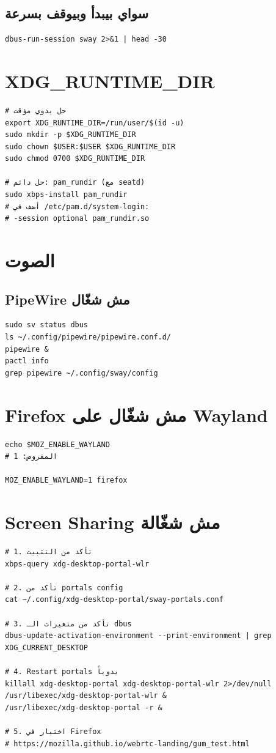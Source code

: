 \documentclass[12pt, a4paper]{report}
\begin{document}
\subsection{سواي بيبدأ وبيوقف بسرعة}
\begin{lstlisting}
dbus-run-session sway 2>&1 | head -30
\end{lstlisting}

\section{XDG\_RUNTIME\_DIR}
\begin{lstlisting}
# حل يدوي مؤقت
export XDG_RUNTIME_DIR=/run/user/$(id -u)
sudo mkdir -p $XDG_RUNTIME_DIR
sudo chown $USER:$USER $XDG_RUNTIME_DIR
sudo chmod 0700 $XDG_RUNTIME_DIR

# حل دائم: pam_rundir (مع seatd)
sudo xbps-install pam_rundir
# أضف في /etc/pam.d/system-login:
# -session optional pam_rundir.so
\end{lstlisting}

\section{الصوت}

\subsection{PipeWire مش شغّال}
\begin{lstlisting}
sudo sv status dbus
ls ~/.config/pipewire/pipewire.conf.d/
pipewire &
pactl info
grep pipewire ~/.config/sway/config
\end{lstlisting}

\section{Firefox مش شغّال على Wayland}
\begin{lstlisting}
echo $MOZ_ENABLE_WAYLAND
# المفروض: 1

MOZ_ENABLE_WAYLAND=1 firefox
\end{lstlisting}

\section{Screen Sharing مش شغّالة}
\begin{lstlisting}
# 1. تأكد من التثبيت
xbps-query xdg-desktop-portal-wlr

# 2. تأكد من portals config
cat ~/.config/xdg-desktop-portal/sway-portals.conf

# 3. تأكد من متغيرات الـ dbus
dbus-update-activation-environment --print-environment | grep XDG_CURRENT_DESKTOP

# 4. Restart portals يدوياً
killall xdg-desktop-portal xdg-desktop-portal-wlr 2>/dev/null
/usr/libexec/xdg-desktop-portal-wlr &
/usr/libexec/xdg-desktop-portal -r &

# 5. اختبار في Firefox
# https://mozilla.github.io/webrtc-landing/gum_test.html
\end{lstlisting}
\end{document}
